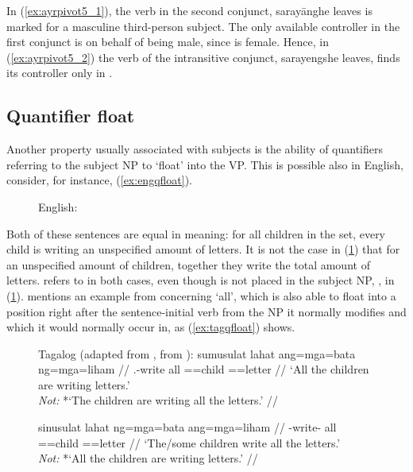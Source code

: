 In (\ref{ex:ayrpivot5_1}), the verb in the second conjunct, 
{sarayāng}{he leaves} is marked for a masculine third-person subject. The only
available controller in the first con\-junct is  on behalf of
being male, since  is female. Hence, in
(\ref{ex:ayrpivot5_2}) the verb of the intransitive conjunct, 
{sarayeng}{she leaves}, finds its controller only in .


\subsection{Quantifier float}
\label{subsec:quantfloat}

Another property usually associated with subjects is the ability of quantifiers
referring to the subject NP to `float' into the VP. This is possible also in
English, consider, for instance, (\ref{ex:engqfloat}).

\begin{figure}[h]
\pex\label{ex:engqfloat}%
English:
\a\label{ex:engqfloat_1}%
\a\label{ex:engqfloat_2}%
\xe
\end{figure}

Both of these sentences are equal in meaning: for all children in the set,
every child is writing an unspecified amount of letters. It is not the case in
(\ref{ex:engqfloat_2}) that for an unspecified amount of children, together
they write the total amount of letters.  refers to  in
both cases, even though  is not placed in the subject NP, , in (\ref{ex:engqfloat_2}). \citet{kroeger1991} mentions an example
from \citet{schachterotanes1972} concerning  `all', which is also
able to float into a position right after the sentence-initial verb from the NP
it normally modifies and which it would normally occur in, as
(\ref{ex:tagqfloat}) shows.

\begin{figure}
\pex\label{ex:tagqfloat}%
Tagalog (adapted from \cite[22]{kroeger1991}, from 
	\cite[501]{schachterotanes1972}):
\a\label{ex:tagqfloat_1}\begingl
	\gla sumusulat lahat ang=mga=bata ng=mga=liham //
	\glb \Av{}.\Impf{}-write all \Nom{}=\Pl{}=child \Gen{}=\Pl{}=letter //
	\glft `All the children are writing letters.'\\
		\textit{Not:} *`The children are writing all the letters.' //
\endgl

\a\label{ex:tagqfloat_2}\begingl
	\gla sinusulat lahat ng=mga=bata ang=mga=liham //
	\glb \Impf{}-write-\Ov{} all \Gen{}=\Pl{}=child \Nom{}=\Pl{}=letter //
	\glft `The/some children write all the letters.'\\
		\textit{Not:} *`All the children are writing letters.' //
\endgl

\xe
\end{figure}

